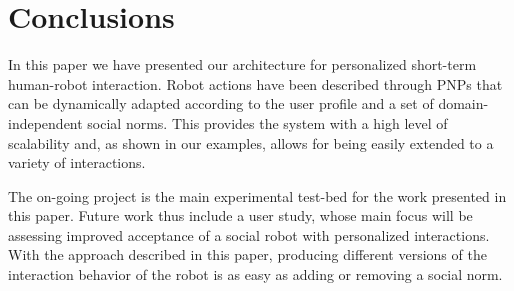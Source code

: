 \vspace{-0.2cm}
\section{Conclusions}
\vspace{-0.1cm}
In this paper we have presented our architecture for personalized
short-term human-robot interaction. Robot actions have been described
through PNPs that can be dynamically adapted according to the user
profile and a set of domain-independent social norms. This provides
the system with a high level of scalability and, as shown in our
examples, allows for being easily extended to a variety of interactions.

The on-going {\coaches} project is the main experimental test-bed for the work presented in this paper. Future work thus include a user study, whose main focus will be assessing improved acceptance of a social robot with personalized interactions. With the approach described in this paper, producing different versions of the interaction behavior of the robot is as easy as adding or removing a social norm.
